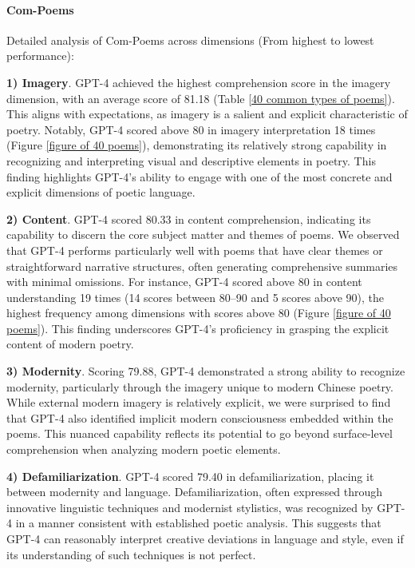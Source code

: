 \documentclass[11pt]{article}
\begin{document}

\paragraph{Com-Poems} Detailed analysis of Com-Poems across dimensions (From highest to lowest performance): 

\textbf{1) Imagery}. GPT-4 achieved the highest comprehension score in the imagery dimension, with an average score of 81.18 (Table \ref{40 common types of poems}). This aligns with expectations, as imagery is a salient and explicit characteristic of poetry. Notably, GPT-4 scored above 80 in imagery interpretation 18 times (Figure \ref{figure of 40 poems}), demonstrating its relatively strong capability in recognizing and interpreting visual and descriptive elements in poetry. This finding highlights GPT-4's ability to engage with one of the most concrete and explicit dimensions of poetic language.

\textbf{2) Content}. GPT-4 scored 80.33 in content comprehension, indicating its capability to discern the core subject matter and themes of poems. We observed that GPT-4 performs particularly well with poems that have clear themes or straightforward narrative structures, often generating comprehensive summaries with minimal omissions. For instance, GPT-4 scored above 80 in content understanding 19 times (14 scores between 80–90 and 5 scores above 90), the highest frequency among dimensions with scores above 80 (Figure \ref{figure of 40 poems}). This finding underscores GPT-4's proficiency in grasping the explicit content of modern poetry.

\textbf{3) Modernity}. Scoring 79.88, GPT-4 demonstrated a strong ability to recognize modernity, particularly through the imagery unique to modern Chinese poetry. While external modern imagery is relatively explicit, we were surprised to find that GPT-4 also identified implicit modern consciousness embedded within the poems. This nuanced capability reflects its potential to go beyond surface-level comprehension when analyzing modern poetic elements.

\textbf{4) Defamiliarization}. GPT-4 scored 79.40 in defamiliarization, placing it between modernity and language. Defamiliarization, often expressed through innovative linguistic techniques and modernist stylistics, was recognized by GPT-4 in a manner consistent with established poetic analysis. This suggests that GPT-4 can reasonably interpret creative deviations in language and style, even if its understanding of such techniques is not perfect.
\end{document}
